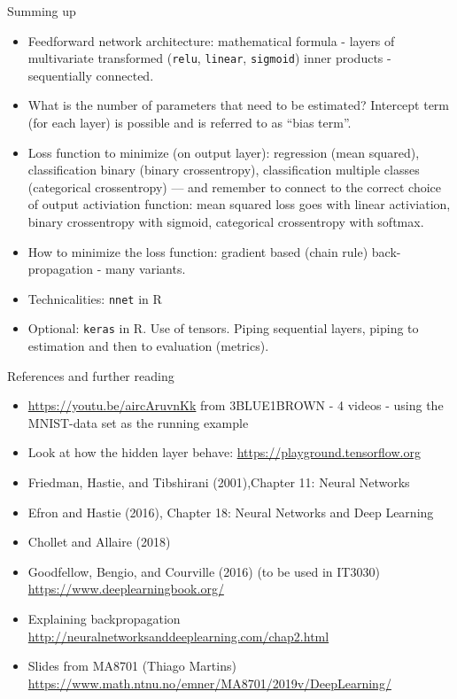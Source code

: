 \documentclass[10pt,ignorenonframetext,]{beamer}
\providecommand{\tightlist}{%
  \setlength{\itemsep}{0pt}\setlength{\parskip}{0pt}}
\begin{document}
\begin{frame}[fragile]{Summing up}
\protect\hypertarget{summing-up-1}{}

\begin{itemize}
\tightlist
\item
  Feedforward network architecture: mathematical formula - layers of
  multivariate transformed (\texttt{relu}, \texttt{linear},
  \texttt{sigmoid}) inner products - sequentially connected.
\item
  What is the number of parameters that need to be estimated? Intercept
  term (for each layer) is possible and is referred to as ``bias term''.
\item
  Loss function to minimize (on output layer): regression (mean
  squared), classification binary (binary crossentropy), classification
  multiple classes (categorical crossentropy) --- and remember to
  connect to the correct choice of output activiation function: mean
  squared loss goes with linear activiation, binary crossentropy with
  sigmoid, categorical crossentropy with softmax.
\item
  How to minimize the loss function: gradient based (chain rule)
  back-propagation - many variants.
\item
  Technicalities: \texttt{nnet} in R
\item
  Optional: \texttt{keras} in R. Use of tensors. Piping sequential
  layers, piping to estimation and then to evaluation (metrics).
\end{itemize}

\end{frame}

\begin{frame}{References and further reading}
\protect\hypertarget{references-and-further-reading}{}

\begin{itemize}
\tightlist
\item
  \url{https://youtu.be/aircAruvnKk} from 3BLUE1BROWN - 4 videos - using
  the MNIST-data set as the running example
\item
  Look at how the hidden layer behave:
  \url{https://playground.tensorflow.org}
\item
  Friedman, Hastie, and Tibshirani (2001),Chapter 11: Neural Networks
\item
  Efron and Hastie (2016), Chapter 18: Neural Networks and Deep Learning
\item
  Chollet and Allaire (2018)
\item
  Goodfellow, Bengio, and Courville (2016) (to be used in IT3030)
  \url{https://www.deeplearningbook.org/}
\item
  Explaining backpropagation
  \url{http://neuralnetworksanddeeplearning.com/chap2.html}
\item
  Slides from MA8701 (Thiago Martins)
  \url{https://www.math.ntnu.no/emner/MA8701/2019v/DeepLearning/}
\end{itemize}

\end{frame}
\end{document}
